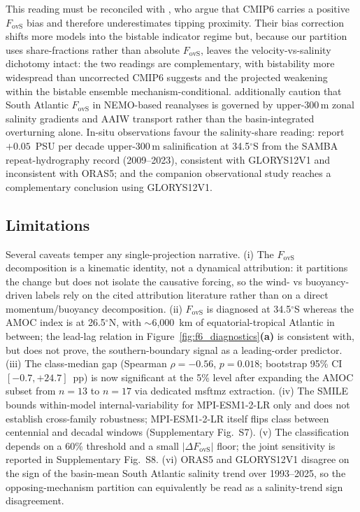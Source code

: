 \documentclass[11pt,a4paper]{article}
\begin{document}
This reading must be reconciled with \citet{vanWestenDijkstra2024}, who argue that CMIP6 carries a positive $F_{\mathrm{ovS}}$ bias and therefore underestimates tipping proximity. Their bias correction shifts more models into the bistable indicator regime but, because our partition uses share-fractions rather than absolute $F_{\mathrm{ovS}}$, leaves the velocity-vs-salinity dichotomy intact: the two readings are complementary, with bistability more widespread than uncorrected CMIP6 suggests and the projected weakening within the bistable ensemble mechanism-conditional. \citet{Mignac2019} additionally caution that South Atlantic $F_{\mathrm{ovS}}$ in NEMO-based reanalyses is governed by upper-300\,m zonal salinity gradients and AAIW transport rather than the basin-integrated overturning alone. In-situ observations favour the salinity-share reading: \citet{Volkov2024} report $+0.05$~PSU per decade upper-300\,m salinification at 34.5$^\circ$S from the SAMBA repeat-hydrography record (2009--2023), consistent with GLORYS12V1 and inconsistent with ORAS5; and the companion observational study \citep{FallahInReview} reaches a complementary conclusion using GLORYS12V1.

\subsection*{Limitations}

Several caveats temper any single-projection narrative. (i) The $F_{\mathrm{ovS}}$ decomposition is a kinematic identity, not a dynamical attribution: it partitions the change but does not isolate the causative forcing, so the wind- vs buoyancy-driven labels rely on the cited attribution literature \citep{Asbjornsen2023, Levang2020, Baker2023, Baker2025} rather than on a direct momentum/buoyancy decomposition. (ii) $F_{\mathrm{ovS}}$ is diagnosed at 34.5$^\circ$S whereas the AMOC index is at 26.5$^\circ$N, with $\sim$6{,}000~km of equatorial-tropical Atlantic in between; the lead-lag relation in Figure~\ref{fig:f6_diagnostics}\textbf{(a)} is consistent with, but does not prove, the southern-boundary signal as a leading-order predictor. (iii) The class-median gap (Spearman $\rho = -0.56$, $p = 0.018$; bootstrap 95\% CI $[-0.7, +24.7]$~pp) is now significant at the 5\% level after expanding the AMOC subset from $n=13$ to $n=17$ via dedicated msftmz extraction. (iv) The SMILE bounds within-model internal-variability for MPI-ESM1-2-LR only and does not establish cross-family robustness; MPI-ESM1-2-LR itself flips class between centennial and decadal windows (Supplementary Fig.~S7). (v) The classification depends on a 60\% threshold and a small $|\Delta F_{\mathrm{ovS}}|$ floor; the joint sensitivity is reported in Supplementary Fig.~S8. (vi) ORAS5 and GLORYS12V1 disagree on the sign of the basin-mean South Atlantic salinity trend over 1993--2025, so the opposing-mechanism partition can equivalently be read as a salinity-trend sign disagreement.
\end{document}
